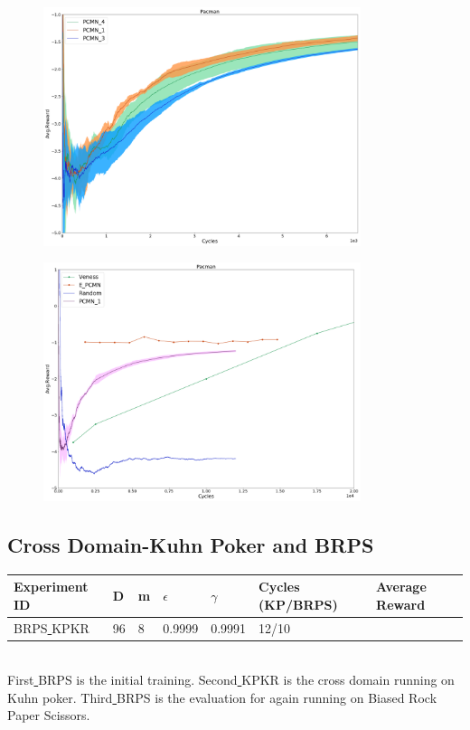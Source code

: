 \documentclass{article}
\theoremstyle{definition}
\newtheorem{primary statistics}[definition]{Primary Statistics}
\newtheorem{auxiliary statistics}[definition]{Auxiliary Statistics}
\begin{document}
 \begin{figure}[h]
 \centering
    \includegraphics[width=9.3cm]{4_Pacman}
\end{figure}

 \begin{figure}[h]
 \centering
    \includegraphics[width=9.3cm]{Pacman}
\end{figure}

\newpage


\subsection{Cross Domain-Kuhn Poker and BRPS }
 \begin{tabular}{|l|l|l|l|l|l|l|}
 \hline \centering
 Experiment ID& D & m & $\epsilon$ & $\gamma$ & Cycles (KP/BRPS) & Average Reward \\ \hline
BRPS\underline{ }KPKR  & 96       & 8           & 0.9999       & 0.9991             & 12/10     &        \\ \hline    
\end{tabular} \\

First\underline{ }BRPS is the initial training. Second\underline{ }KPKR is the cross domain running on Kuhn poker. Third\underline{ }BRPS is the evaluation for again running on Biased Rock Paper Scissors.
\end{document}
